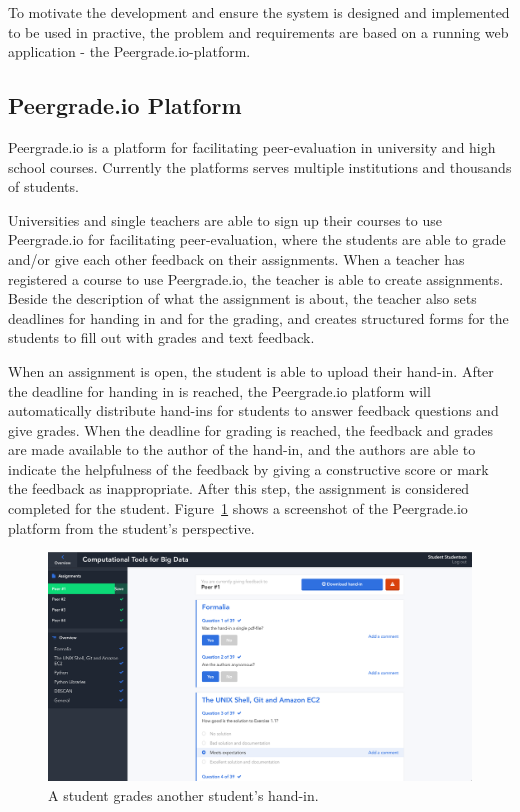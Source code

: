 To motivate the development and ensure the system is designed and implemented to be used in practive, the problem and requirements are based on a running web application - the Peergrade.io-platform.

\subsection{Peergrade.io Platform}
\label{subsec:the-peergrade-io-platform}

Peergrade.io is a platform for facilitating peer-evaluation in university and high school courses. Currently the platforms serves multiple institutions and thousands of students.

Universities and single teachers are able to sign up their courses to use Peergrade.io for facilitating peer-evaluation, where the students are able to grade and/or give each other feedback on their assignments. When a teacher has registered a course to use Peergrade.io, the teacher is able to create assignments. Beside the description of what the assignment is about, the teacher also sets deadlines for handing in and for the grading, and creates structured forms for the students to fill out with grades and text feedback.

When an assignment is open, the student is able to upload their hand-in. After the deadline for handing in is reached, the Peergrade.io platform will automatically distribute hand-ins for students to answer feedback questions and give grades. When the deadline for grading is reached, the feedback and grades are made available to the author of the hand-in, and the authors are able to indicate the helpfulness of the feedback by giving a constructive score or mark the feedback as inappropriate. After this step, the assignment is considered completed for the student. Figure~\ref{fig:student-screenshot} shows a screenshot of the Peergrade.io platform from the student's perspective.

\begin{figure}[ht!]
  \includegraphics[width=\textwidth]{figures/screenshots/student_give_feedback.png}
  \caption[Screenshot from Peergrade.io]{A student grades another student's hand-in.}
  \label{fig:student-screenshot}
\end{figure}

